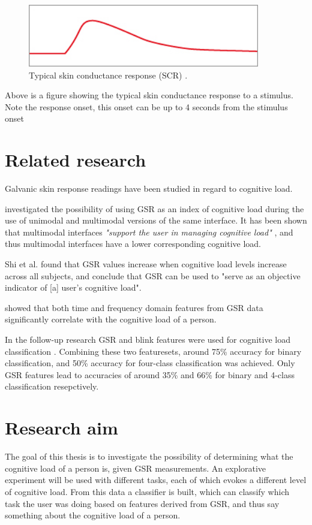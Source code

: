 \documentclass[11pt,leqno,a4paper]{report} %
\begin{document}
\begin{figure}[H]
  \centering   
    \includegraphics[width=0.9\textwidth]{gsr.jpg}
  \caption{Typical skin conductance response (SCR) \cite{dow_sc_explained_}.}
\end{figure}

Above is a figure showing the typical skin conductance response to a stimulus. Note the response onset, this onset can be up to 4 seconds from the stimulus onset \citep{dow_sc_explained_}


\section{Related research}
Galvanic skin response readings have been studied in regard to cognitive load.

\citep{Shi2007} investigated the possibility of using GSR as an index of cognitive load during the use of unimodal and multimodal versions of the same interface. It has been shown that multimodal interfaces \textit{"support the user in managing cognitive load"} \citep{Oviatt2004}, and thus multimodal interfaces have a lower corresponding cognitive load. 

Shi et al. found that GSR values increase when cognitive load levels increase across all subjects, and conclude that GSR can be used to "serve as an objective indicator of [a] user's cognitive load".

\citep{Nourbakhsh2012} showed that both time and frequency domain features from GSR data significantly correlate with the cognitive load of a person.

In the follow-up research GSR and blink features were used for cognitive load classification \citep{Nourbakhsh2013}. Combining these two featuresets, around 75\% accuracy for binary classification, and 50\% accuracy for four-class classification was achieved. Only GSR features lead to accuracies of around 35\% and 66\% for binary and 4-class classification resepctively.

\section{Research aim}
The goal of this thesis is to investigate the possibility of determining what the cognitive load of a person is, given GSR measurements. An explorative experiment will be used with different tasks, each of which evokes a different level of cognitive load. From this data a classifier is built, which can classify which task the user was doing based on features derived from GSR, and thus say something about the cognitive load of a person.
\end{document}
